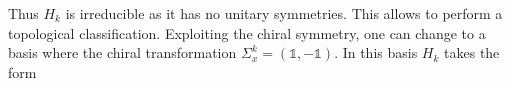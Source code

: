 Thus $H_k$ is irreducible as it has no unitary symmetries. This allows to perform a topological classification. %
Exploiting the chiral symmetry, one can change to a basis where the chiral transformation $\Sigma_x^k=(\mathbb{1},-\mathbb{1})$. In this basis $H_k$ takes the form
